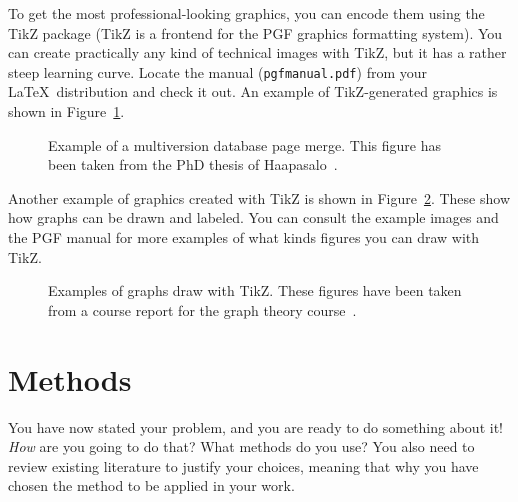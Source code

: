 \documentclass[12pt,a4paper,oneside,pdftex]{report}
\begin{document}
To get the most professional-looking graphics, you can encode them using the
TikZ package (TikZ is a frontend for the PGF graphics formatting system).
You can create practically any kind of technical images with TikZ, but it has a
rather steep learning curve. Locate the manual (\texttt{pgfmanual.pdf}) from
your \LaTeX\ distribution and check it out. An example of TikZ-generated
graphics is shown in Figure~\ref{fig:page-merge}.

\begin{figure}[ht]
  \begin{center}
    
    \caption{Example of a multiversion database page merge. This figure has
    been taken from the PhD thesis of Haapasalo~\cite{HaapasaloThesis}.}
    \label{fig:page-merge}
  \end{center}
\end{figure}

Another example of graphics created with TikZ is shown in
Figure~\ref{fig:tikz-examples}.
These show how graphs can be drawn and labeled.
You can consult the example images and the PGF manual for more examples of what
kinds figures you can draw with TikZ.

\newlength{\graphdotsize}
\setlength{\graphdotsize}{1.7pt}
\newlength{\graphgridsize}
\setlength{\graphgridsize}{1.2em}
\begin{figure}[ht]
\begin{center}
\caption{Examples of graphs draw with TikZ. These figures have been taken from a
course report for the graph theory course~\cite{FerryProblem}.}
\label{fig:tikz-examples}
\end{center}
\end{figure}



% 

\chapter{Methods}
\label{chapter:methods}

You have now stated your problem, and you are ready to do something
about it!  \emph{How} are you going to do that? What methods do you
use?  You also need to review existing literature to justify your
choices, meaning that why you have chosen the method to be applied in
your work.
\end{document}
